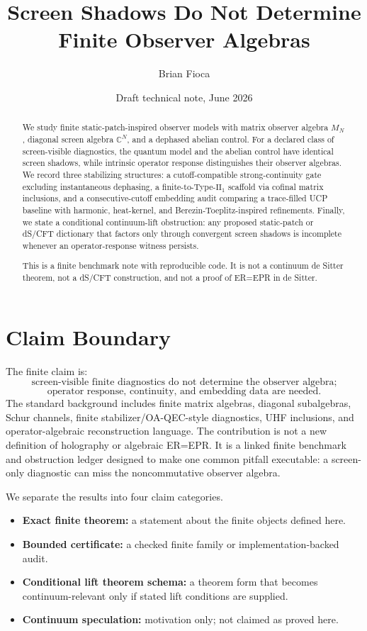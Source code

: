 \documentclass[11pt]{article}
\title{Screen Shadows Do Not Determine Finite Observer Algebras}
\author{Brian Fioca}
\date{Draft technical note, June 2026}
\newcommand{\MN}{M_N}
\newcommand{\CN}{\mathbb{C}^N}
\begin{document}
\maketitle

\begin{abstract}
We study finite static-patch-inspired observer models with matrix observer
algebra $\MN$, diagonal screen algebra $\CN$, and a dephased abelian control.
For a declared class of screen-visible diagnostics, the quantum model and the
abelian control have identical screen shadows, while intrinsic operator
response distinguishes their observer algebras. We record three stabilizing
structures: a cutoff-compatible strong-continuity gate excluding
instantaneous dephasing, a finite-to-Type-$\mathrm{II}_1$ scaffold via cofinal
matrix inclusions, and a consecutive-cutoff embedding audit comparing a
trace-filled UCP baseline with harmonic, heat-kernel, and
Berezin-Toeplitz-inspired refinements. Finally, we state a conditional
continuum-lift obstruction: any proposed static-patch or dS/CFT dictionary
that factors only through convergent screen shadows is incomplete whenever an
operator-response witness persists.

This is a finite benchmark note with reproducible code. It is not a continuum
de Sitter theorem, not a dS/CFT construction, and not a proof of ER=EPR in de
Sitter.
\end{abstract}

\section{Claim Boundary}

The finite claim is:
\[
\text{screen-visible finite diagnostics do not determine the observer algebra;}
\]
\[
\text{operator response, continuity, and embedding data are needed.}
\]
The standard background includes finite matrix algebras, diagonal
subalgebras, Schur channels, finite stabilizer/OA-QEC-style diagnostics, UHF
inclusions, and operator-algebraic reconstruction language. The contribution
is not a new definition of holography or algebraic ER=EPR. It is a linked
finite benchmark and obstruction ledger designed to make one common pitfall
executable: a screen-only diagnostic can miss the noncommutative observer
algebra.

We separate the results into four claim categories.
\begin{itemize}[leftmargin=2em]
\item \textbf{Exact finite theorem:} a statement about the finite objects
defined here.
\item \textbf{Bounded certificate:} a checked finite family or
implementation-backed audit.
\item \textbf{Conditional lift theorem schema:} a theorem form that becomes
continuum-relevant only if stated lift conditions are supplied.
\item \textbf{Continuum speculation:} motivation only; not claimed as proved
here.
\end{itemize}
\end{document}
